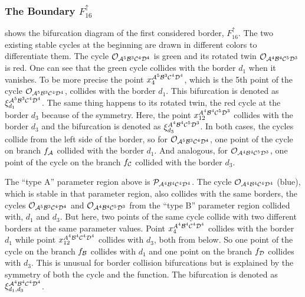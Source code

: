 

\subsubsection{The Boundary $F_{16}^\uparrow$}
\label{sec:minrep.bif.U}

 shows the bifurcation diagram of the first considered border, $F_{16}^\uparrow$.
The two existing stable cycles at the beginning are drawn in different colors to differentiate them.
The cycle $\mathcal{O}_{\mathcal{A}^5\mathcal{B}^3\mathcal{C}^4\mathcal{D}^4}$ is green and its rotated twin $\mathcal{O}_{\mathcal{A}^4\mathcal{B}^4\mathcal{C}^5\mathcal{D}^3}$ is red.
One can see that the green cycle collides with the border $d_1$ when it vanishes.
To be more precise the point $x_4^{\mathcal{A}^5\mathcal{B}^3\mathcal{C}^4\mathcal{D}^4}$, which is the 5th point of the cycle $\mathcal{O}_{\mathcal{A}^5\mathcal{B}^3\mathcal{C}^4\mathcal{D}^4}$, collides with the border $d_1$.
This bifurcation is denoted as $\xi_{d_1}^{\mathcal{A}^5\mathcal{B}^3\mathcal{C}^4\mathcal{D}^4}$.
The same thing happens to its rotated twin, the red cycle at the border $d_3$ because of the symmetry.
Here, the point $x_{12}^{A^4\mathcal{B}^4\mathcal{C}^5\mathcal{D}^3}$ collides with the border $d_3$ and the bifurcation is denoted as $\xi_{d_3}^{A^4\mathcal{B}^4\mathcal{C}^5\mathcal{D}^3}$.
In both cases, the cycles collide from the left side of the border, so for $\mathcal{O}_{\mathcal{A}^5\mathcal{B}^3\mathcal{C}^4\mathcal{D}^4}$, one point of the cycle on branch $f_{\mathcal{A}}$ collided with the border $d_1$.
And analogous, for $\mathcal{O}_{\mathcal{A}^4\mathcal{B}^4\mathcal{C}^5\mathcal{D}^3}$, one point of the cycle on the branch $f_{\mathcal{C}}$ collided with the border $d_3$.

The ``type A'' parameter region above is $\mathcal{P}_{\mathcal{A}^4\mathcal{B}^4\mathcal{C}^4\mathcal{D}^4}$.
The cycle $\mathcal{O}_{\mathcal{A}^4\mathcal{B}^4\mathcal{C}^4\mathcal{D}^4}$ (blue), which is stable in that parameter region, also collides with the same borders, the cycles $\mathcal{O}_{\mathcal{A}^5\mathcal{B}^3\mathcal{C}^4\mathcal{D}^4}$ and $\mathcal{O}_{\mathcal{A}^4\mathcal{B}^4\mathcal{C}^5\mathcal{D}^3}$ from the ``type B'' parameter region collided with, $d_1$ and $d_3$.
But here, two points of the same cycle collide with two different borders at the same parameter values.
Point $x_{4}^{A^4\mathcal{B}^4\mathcal{C}^4\mathcal{D}^4}$ collides with the border $d_1$ while point $x_{12}^{A^4\mathcal{B}^4\mathcal{C}^4\mathcal{D}^4}$ collides with $d_3$, both from below.
So one point of the cycle on the branch $f_{\mathcal{B}}$ collides with $d_1$ and one point on the branch $f_{\mathcal{D}}$ collides with $d_3$.
This is unusual for border collision bifurcations but is explained by the symmetry of both the cycle and the function.
The bifurcation is denoted as $\xi_{d_1, d_3}^{\mathcal{A}^4\mathcal{B}^4\mathcal{C}^4\mathcal{D}^4}$.

